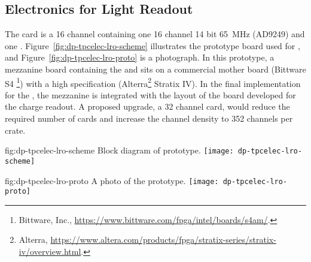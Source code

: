 \subsection{Electronics for Light Readout}
\label{sec:fddp-tpc-elec-design-lro}

The  card is a \num{16} channel  containing one \num{16} channel \num{14} bit \SI{65}{\MHz}  (AD9249) and one  . Figure~\ref{fig:dp-tpcelec-lro-scheme} illustrates %
the prototype board used for , and Figure~\ref{fig:dp-tpcelec-lro-proto} is %
a photograph. 
In this prototype, a mezzanine board containing the  and  sits on a commercial mother board (Bittware S4 \footnote{Bittware\texttrademark{}, Inc., \url{https://www.bittware.com/fpga/intel/boards/s4am/}.}) with a high specification  (Alterra\footnote{Alterra\texttrademark{}, \url{https://www.altera.com/products/fpga/stratix-series/stratix-iv/overview.html}.} Stratix IV). In the final implementation %
for the , the mezzanine is integrated with the layout of the  board developed for the charge readout.  
A proposed upgrade, a \num{32} channel card, would reduce the required number of cards and increase the channel density to \num{352} channels per  crate.

\begin{dunefigure}{fig:dp-tpcelec-lro-scheme}
{Block diagram of  prototype.}
\texttt{[image: dp-tpcelec-lro-scheme]}
\end{dunefigure}

\begin{dunefigure}{fig:dp-tpcelec-lro-proto}
{A photo of the  prototype.}
\texttt{[image: dp-tpcelec-lro-proto]}
\end{dunefigure}

